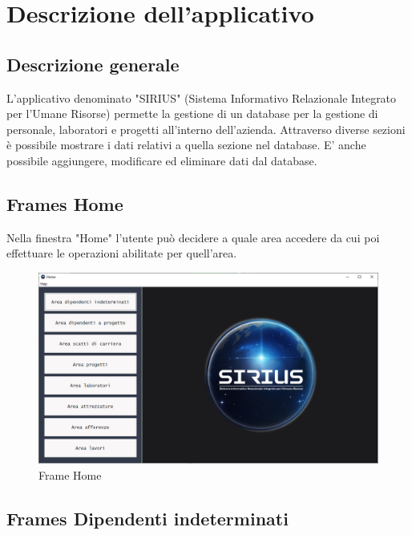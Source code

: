 \chapter{Descrizione dell'applicativo}
    \section{Descrizione generale}
        L'applicativo denominato "SIRIUS" (Sistema Informativo Relazionale Integrato per l'Umane Risorse) permette la gestione di un database per la gestione di personale, laboratori e progetti all'interno dell'azienda. Attraverso diverse sezioni è possibile mostrare i dati relativi a quella sezione nel database. E' anche possibile aggiungere, modificare ed eliminare dati dal database.

    \section{Frames Home}
        Nella finestra "Home" l'utente può decidere a quale area accedere da cui poi effettuare le operazioni abilitate per quell'area.
        \begin{figure}[htbp!]
            \centering
                \vspace{2\baselineskip}
                \includegraphics[width=0.9\linewidth]{Immagini/Frames/Frame Home.png}
            \caption{Frame Home}
            \label{fig:Frame Home}
        \end{figure}

    \newpage

    \section{Frames Dipendenti indeterminati}
